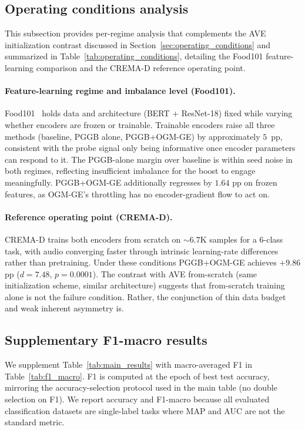 \documentclass{article}
\begin{document}
\subsection{Operating conditions analysis}
\label{app:opcond}

This subsection provides per-regime analysis that complements the AVE initialization contrast discussed in Section~\ref{sec:operating_conditions} and summarized in Table~\ref{tab:operating_conditions}, detailing the Food101 feature-learning comparison and the CREMA-D reference operating point.

\paragraph{Feature-learning regime and imbalance level (Food101).}
Food101~\citep{wang2015upmcfood} holds data and architecture (BERT + ResNet-18) fixed while varying whether encoders are frozen or trainable. Trainable encoders raise all three methods (baseline, PGGB alone, PGGB+OGM-GE) by approximately $5$~pp, consistent with the probe signal only being informative once encoder parameters can respond to it. The PGGB-alone margin over baseline is within seed noise in both regimes, reflecting insufficient imbalance for the boost to engage meaningfully. PGGB+OGM-GE additionally regresses by $1.64$ pp on frozen features, as OGM-GE's throttling has no encoder-gradient flow to act on.

\paragraph{Reference operating point (CREMA-D).}
CREMA-D trains both encoders from scratch on $\sim 6.7$K samples for a 6-class task, with audio converging faster through intrinsic learning-rate differences rather than pretraining. Under these conditions PGGB+OGM-GE achieves $+9.86$ pp ($d{=}7.48$, $p{=}0.0001$). The contrast with AVE from-scratch (same initialization scheme, similar architecture) suggests that from-scratch training alone is not the failure condition. Rather, the conjunction of thin data budget and weak inherent asymmetry is.

\subsection{Supplementary F1-macro results}
\label{app:f1}

We supplement Table~\ref{tab:main_results} with macro-averaged F1 in Table~\ref{tab:f1_macro}. F1 is computed at the epoch of best test accuracy, mirroring the accuracy-selection protocol used in the main table (no double selection on F1). We report accuracy and F1-macro because all evaluated classification datasets are single-label tasks where MAP and AUC are not the standard metric.
\end{document}
